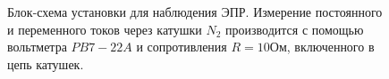 \documentclass[a4paper]{article}
\begin{document}
\begin{figure}[H]
    \caption{Блок-схема установки для наблюдения ЭПР. Измерение постоянного и переменного токов через катушки $N_2$ производится с помощью вольтметра $PB7-22A$ и сопротивления $R = 10 Ом$, включенного в цепь катушек.}
    \label{pic2}
    \end{figure}

\end{document}
